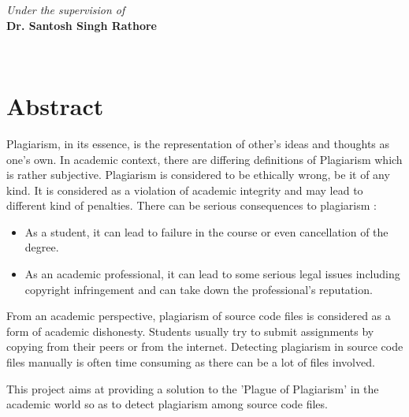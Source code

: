 \documentclass[12pt]{article}
\begin{document}
\begin{titlepage}
	
    \begin{flushleft}
	
	\begin{minipage}{0.4\textwidth}
			\emph{Under the supervision of } \\
		\textbf{Dr. Santosh Singh Rathore}\linebreak
	\end{minipage}\\[2 cm]

	\end{flushleft}
 
	\vfill
	
\end{titlepage}


\tableofcontents
\pagebreak

\section{Abstract}
Plagiarism, in its essence, is the representation of other's ideas and thoughts as one's own. In academic context, there are differing definitions of Plagiarism which is rather subjective. Plagiarism is considered to be ethically wrong, be it of any kind. It is considered as a violation of academic integrity and may lead to different kind of penalties. There can be serious consequences to plagiarism :\par
\begin{itemize}
    \item As a student, it can lead to failure in the course or even cancellation of the degree.
    \item As an academic professional, it can lead to some serious legal issues including copyright infringement and can take down the professional's reputation.
\end{itemize}
From an academic perspective, plagiarism of source code files is considered as a form of academic dishonesty. Students usually try to submit assignments by copying from their peers or from the internet. Detecting plagiarism in source code files manually is often time consuming as there can be a lot of files involved.\par
This project aims at providing a solution to the 'Plague of Plagiarism' in the academic world so as to detect plagiarism among source code files.
\end{document}
